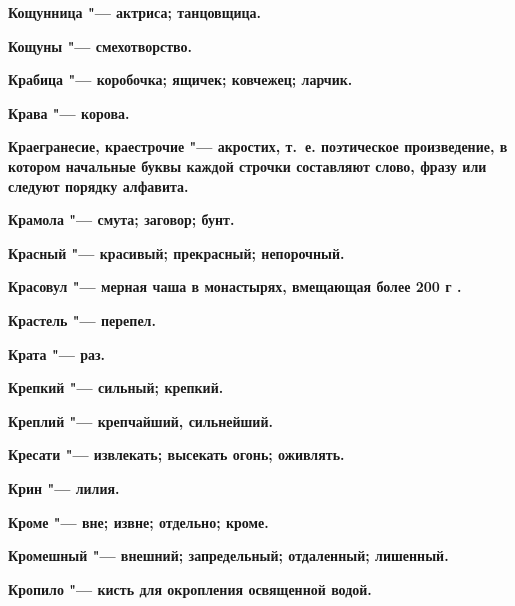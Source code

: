 \begin{multicols}{2}
\bfseries Кощунница\normalfont{} "--- актриса; танцовщица. 




\bfseries Кощуны\normalfont{} "--- смехотворство. 




\bfseries Крабица\normalfont{} "--- коробочка; ящичек; ковчежец; ларчик. 




\bfseries Крава\normalfont{} "--- корова. 




\bfseries Краегранесие, краестрочие\normalfont{} "--- акростих, т.~е. поэтическое произведение, в котором начальные буквы каждой строчки составляют слово, фразу или следуют порядку алфавита. 




\bfseries Крамола\normalfont{} "--- смута; заговор; бунт. 




\bfseries Красный\normalfont{} "--- красивый; прекрасный; непорочный. 




\bfseries Красовул\normalfont{} "--- мерная чаша в монастырях, вмещающая более 200 г . 




\bfseries Крастель\normalfont{} "--- перепел. 




\bfseries Крата\normalfont{} "--- раз. 




\bfseries Крепкий\normalfont{} "--- сильный; крепкий. 




\bfseries Креплий\normalfont{} "--- крепчайший, сильнейший. 




\bfseries Кресати\normalfont{} "--- извлекать; высекать огонь; оживлять. 




\bfseries Крин\normalfont{} "--- лилия. 




\bfseries Кроме\normalfont{} "--- вне; извне; отдельно; кроме. 




\bfseries Кромешный\normalfont{} "--- внешний; запредельный; отдаленный; лишенный. 




\bfseries Кропило\normalfont{} "--- кисть для окропления освященной водой. 





\end{multicols}

